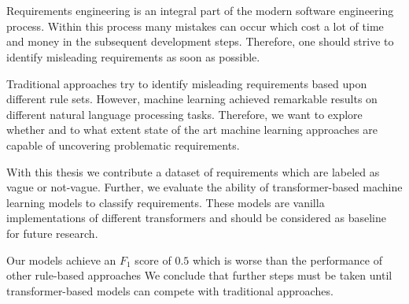 \chapter{\abstractname}

Requirements engineering is an integral part of the modern software engineering process.
Within this process many mistakes can occur which cost a lot of time and money in the subsequent development steps.
Therefore, one should strive to identify misleading requirements as soon as possible.

Traditional approaches try to identify misleading requirements based upon different rule sets.
However, machine learning achieved remarkable results on different natural language processing tasks.
Therefore, we want to explore whether and to what extent state of the art machine learning approaches are capable of uncovering problematic requirements.

With this thesis we contribute a dataset of requirements which are labeled as vague or not-vague.
Further, we evaluate the ability of transformer-based machine learning models to classify requirements.
These models are vanilla implementations of different transformers and should be considered as baseline for future research.

Our models achieve an $F_1$ score of $0.5$ which is worse than the performance of other rule-based approaches
We conclude that further steps must be taken until transformer\nobreakdash-based models can compete with traditional approaches.
